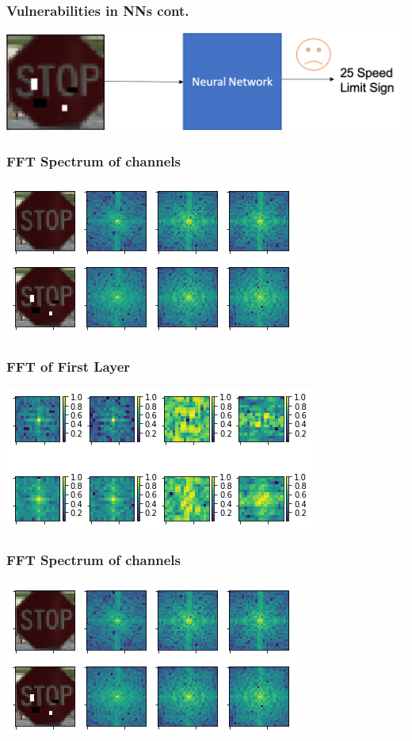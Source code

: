 \documentclass{beamer}
\begin{document}
\begin{frame}
\frametitle{Vulnerabilities in NNs cont.}
\begin{center}
	\includegraphics[scale=0.4]{advclassification2.png}
\end{center}
\end{frame}

\begin{frame}
\frametitle{FFT Spectrum of channels}
\begin{center}
	\includegraphics[scale=0.6]{regular_blur.png}
\end{center}
\end{frame}

\begin{frame}
\frametitle{FFT of First Layer}
\begin{center}
	\includegraphics[scale=0.7]{fft_filters.png}
\end{center}
\end{frame}

\begin{frame}
\frametitle{FFT Spectrum of channels}
\begin{center}
	\includegraphics[scale=0.6]{regular_blur.png}
\end{center}
\end{frame}
\end{document}
